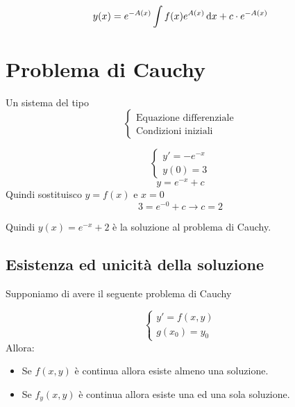 \begin{definition}
$$
y(x) = e^{-A(x)} \int f(x) e^{A(x)} \mathop{}\!\mathrm{d} x + c \cdot e^{-A(x)}
$$
\end{definition}

\section{Problema di Cauchy}

Un sistema del tipo
$$
\begin{cases}
\text{Equazione differenziale} \\
\text{Condizioni iniziali}
\end{cases}
$$

\begin{example}
$$
\begin{cases}
y' = -e^{-x} \\
y(0) = 3
\end{cases}
$$
$$
y = e^{-x} + c
$$
Quindi sostituisco $y=f(x)$ e $x=0$
$$
3 = e^{-0} + c \to
c = 2
$$

Quindi $y(x)=e^{-x}+2$ è la soluzione al problema di Cauchy.
\end{example}

\subsection{Esistenza ed unicità della soluzione}

Supponiamo di avere il seguente problema di Cauchy

$$
\begin{cases}
y' = f(x,y) \\
g(x_0) = y_0
\end{cases}
$$
Allora:
\begin{itemize}
\item Se $f(x,y)$ è continua allora esiste almeno una soluzione.
\item Se $f_y(x,y)$ è continua allora esiste una ed una sola soluzione.
\end{itemize}